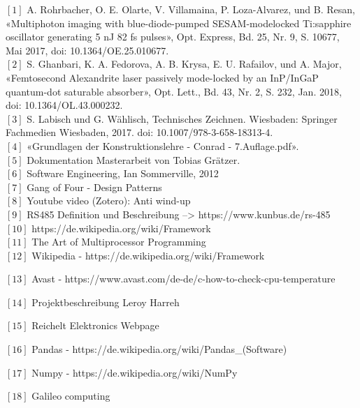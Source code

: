 $[1]$	A. Rohrbacher, O. E. Olarte, V. Villamaina, P. Loza-Alvarez, und B. Resan, «Multiphoton imaging with blue-diode-pumped SESAM-modelocked Ti:sapphire oscillator generating 5 nJ 82 fs pulses», Opt. Express, Bd. 25, Nr. 9, S. 10677, Mai 2017, doi: 10.1364/OE.25.010677.\\

$[2]$	S. Ghanbari, K. A. Fedorova, A. B. Krysa, E. U. Rafailov, und A. Major, «Femtosecond Alexandrite laser passively mode-locked by an InP/InGaP quantum-dot saturable absorber», Opt. Lett., Bd. 43, Nr. 2, S. 232, Jan. 2018, doi: 10.1364/OL.43.000232.\\

$[3]$   S. Labisch und G. Wählisch, Technisches Zeichnen. Wiesbaden: Springer Fachmedien Wiesbaden, 2017. doi: 10.1007/978-3-658-18313-4.\\

$[4]$   «Grundlagen der Konstruktionslehre - Conrad - 7.Auflage.pdf».\\

$[5]$   Dokumentation Masterarbeit von Tobias Grätzer.\\

$[6]$   Software Engineering, Ian Sommerville, 2012\\

$[7]$   Gang of Four - Design Patterns\\

$[8]$   Youtube video (Zotero): Anti wind-up\\

$[9]$   RS485 Definition und Beschreibung --> https://www.kunbus.de/rs-485\\

$[10]$  https://de.wikipedia.org/wiki/Framework\\

$[11]$  The Art of Multiprocessor Programming\\

$[12]$  Wikipedia - https://de.wikipedia.org/wiki/Framework

$[13]$  Avast - https://www.avast.com/de-de/c-how-to-check-cpu-temperature

$[14]$  Projektbeschreibung Leroy Harreh

$[15]$  Reichelt Elektronics Webpage

$[16]$ Pandas - https://de.wikipedia.org/wiki/Pandas_(Software)

$[17]$ Numpy - https://de.wikipedia.org/wiki/NumPy

$[18]$ Galileo computing